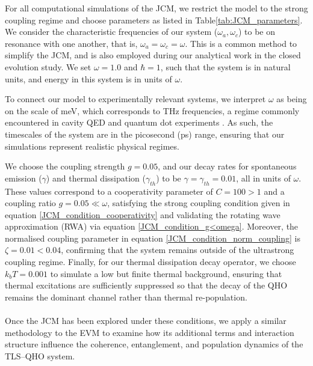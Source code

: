 \documentclass[11pt]{article}
\begin{document}
\noindent For all computational simulations of the JCM, we restrict the model to the strong coupling regime and choose parameters as listed in Table\ref{tab:JCM_parameters}. We consider the characteristic frequencies of our system ($\omega_a, \omega_c$) to be on resonance with one another, that is, $\omega_a = \omega_c = \omega$. This is a common method to simplify the JCM, and is also employed during our analytical work in the closed evolution study. We set $\omega = 1.0$ and $\hbar = 1$, such that the system is in natural units, and energy in this system is in units of $\omega$. 

\noindent To connect our model to experimentally relevant systems, we interpret $\omega$ as being on the scale of meV, which corresponds to THz frequencies, a regime commonly encountered in cavity QED and quantum dot experiments \cite{General2024-JCM_relevance}. As such, the timescales of the system are in the picosecond (ps) range, ensuring that our simulations represent realistic physical regimes.

We choose the coupling strength $g = 0.05$, and our decay rates for spontaneous emission ($\gamma$) and thermal dissipation ($\gamma_{\scriptscriptstyle th}$) to be $\gamma = \gamma_{\scriptscriptstyle th} = 0.01$, all in units of $\omega$. These values correspond to a cooperativity parameter of $C = 100 > 1$ and a coupling ratio $g = 0.05 \ll \omega$, satisfying the strong coupling condition given in equation \eqref{JCM_condition_cooperativity} and validating the rotating wave approximation (RWA) via equation \eqref{JCM_condition_g<omega}. Moreover, the normalised coupling parameter in equation \eqref{JCM_condition_norm_coupling} is $\zeta = 0.01 < 0.04$, confirming that the system remains outside of the ultrastrong coupling regime. Finally, for our thermal dissipation decay operator, we choose $k_bT = 0.001$ to simulate a low but finite thermal background, ensuring that thermal excitations are sufficiently suppressed so that the decay of the QHO remains the dominant channel rather than thermal re-population.\\
\\
Once the JCM has been explored under these conditions, we apply a similar methodology to the EVM to examine how its additional terms and interaction structure influence the coherence, entanglement, and population dynamics of the TLS--QHO system. 
\end{document}
